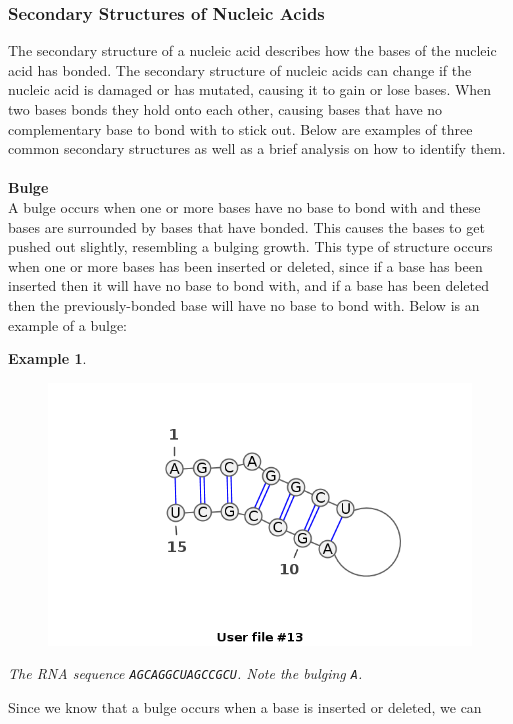 \documentclass{article}
\newtheorem{myex}{Example}
\begin{document}


\subsubsection{Secondary Structures of Nucleic Acids}
The secondary structure of a nucleic acid describes how the bases of the 
nucleic acid has bonded. The secondary structure of nucleic acids can change if 
the nucleic acid is damaged or has mutated, causing it to gain or lose 
bases. When two bases bonds they hold onto each other, causing bases that 
have no complementary base to bond with to stick out. Below are examples of three 
common secondary structures as well as a brief analysis on how to identify them.\\\\
\textbf{Bulge}\\ 
A bulge occurs when one or more bases have no base to bond with and these 
bases are surrounded by bases that have bonded. This causes the bases to get 
pushed out slightly, resembling a bulging growth. This type of structure occurs 
when one or more bases has been inserted or deleted, since if a base has been 
inserted then it will have no base to bond with, and if a base has been deleted 
then the previously-bonded base will have no base to bond with. 
Below is an example of a bulge:
\begin{myex}\centering
\begin{figure}[h]
\includegraphics[scale=0.4]{bulge.png}
\end{figure}
The RNA sequence {\tt AGCAGGCUAGCCGCU}. Note the bulging {\tt A}.
\end{myex}
Since we know that a bulge occurs when a base is inserted or deleted, we can 
\end{document}
